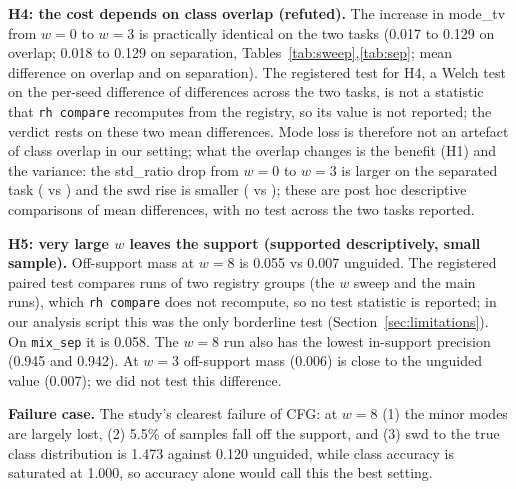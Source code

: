 \textbf{H4: the cost depends on class overlap (refuted).} The increase in mode\_tv from $w=0$ to $w=3$ is practically identical on the two tasks (0.017 to 0.129 on overlap; 0.018 to 0.129 on separation, Tables~\ref{tab:sweep},\ref{tab:sep}; mean difference  on overlap and  on separation). The registered test for H4, a Welch test on the per-seed difference of differences across the two tasks, is not a statistic that \texttt{rh compare} recomputes from the registry, so its value is not reported; the verdict rests on these two mean differences. Mode loss is therefore not an artefact of class overlap in our setting; what the overlap changes is the benefit (H1) and the variance: the std\_ratio drop from $w=0$ to $w=3$ is larger on the separated task ( vs ) and the swd rise is smaller ( vs ); these are post hoc descriptive comparisons of mean differences, with no test across the two tasks reported.

\textbf{H5: very large $w$ leaves the support (supported descriptively, small sample).} Off-support mass at $w=8$ is 0.055 vs 0.007 unguided. The registered paired test compares runs of two registry groups (the $w$ sweep and the main runs), which \texttt{rh compare} does not recompute, so no test statistic is reported; in our analysis script this was the only borderline test (Section~\ref{sec:limitations}). On \texttt{mix\_sep} it is 0.058. The $w=8$ run also has the lowest in-support precision (0.945 and 0.942). At $w=3$ off-support mass (0.006) is close to the unguided value (0.007); we did not test this difference.

\textbf{Failure case.} The study's clearest failure of CFG: at $w=8$ (1) the minor modes are largely lost, (2) 5.5\% of samples fall off the support, and (3) swd to the true class distribution is 1.473 against 0.120 unguided, while class accuracy is saturated at 1.000, so accuracy alone would call this the best setting.

\begin{table}[t]\centering\caption{Separated task (mean of five seeds); columns as in Table~\ref{tab:sweep}.}\label{tab:sep}

\end{table}
